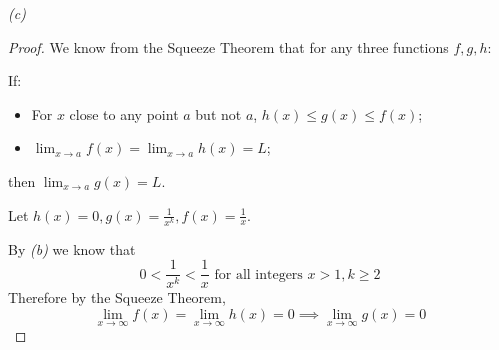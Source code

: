 \documentclass[12pt, a4paper]{article}
\newcommand{\displim}[1]{\displaystyle{\lim_{#1}}}
\begin{document}
\newpage

\textit{(c)}

\begin{proof}
    We know from the Squeeze Theorem that for any three functions $f, g, h$:

    If:
    \begin{itemize}
        \item For $x$ close to any point $a$ but not $a$, $h(x) \leq g(x) \leq f(x)$;
        \item $\displim{x \to a} f(x) = \displim{x \to a} h(x) = L$;
    \end{itemize}

    then $\displim{x \to a} g(x) = L$.

    Let $h(x) = 0, g(x) = \tfrac{1}{x^k}, f(x) = \tfrac{1}{x}$.

    By \textit{(b)} we know that
    \[
        0 < \frac{1}{x^k} < \frac{1}{x} \text{ for all integers $x > 1, k \geq 2$}
    \]
    Therefore by the Squeeze Theorem,
    \[
        \displim{x \to \infty} f(x) = \displim{x \to \infty} h(x) = 0 \implies
        \displim{x \to \infty} g(x) = 0
    \]

\end{proof}
\end{document}
